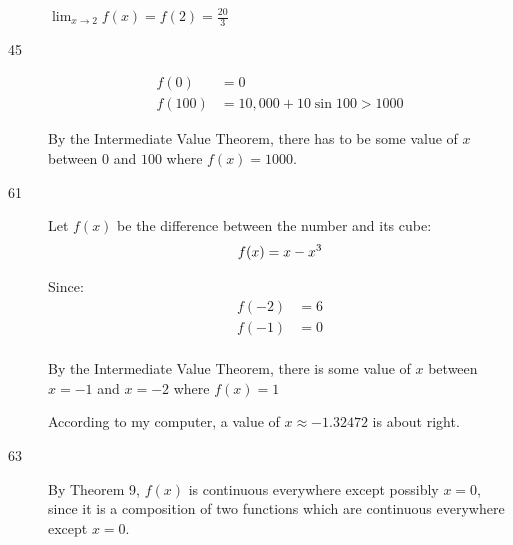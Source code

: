 \documentclass[letterpaper]{exam}
\begin{document}
\begin{description}
        $\lim_{x \to 2} f(x) = f(2) = \frac{20}{3}$



      \item[45]
        \begin{align*}
          f(0) &= 0 \\
          f(100) &= 10,000 + 10 \sin 100 > 1000
        \end{align*}

        By the Intermediate Value Theorem, there has to be some value of $x$ between
        $0$ and $100$ where $f(x) = 1000$.

      \item[61]
        Let $f(x)$ be the difference between the number and its cube:
        \[
          f(x) = x - x^3  \\
        \]

        Since:
        \begin{align*}
          f(-2) &= 6 \\
          f(-1) &= 0 \\
        \end{align*}

        By the Intermediate Value Theorem, there is some value of $x$ between $x = -1$ and
        $x = -2$ where $f(x) = 1$

        According to my computer, a value of $x \approx -1.32472$ is about right.

      \item[63]
        By Theorem 9, $f(x)$ is continuous everywhere except possibly $x = 0$, since it is
        a composition of two functions which are continuous everywhere except $x = 0$.


\end{description}
\end{document}
